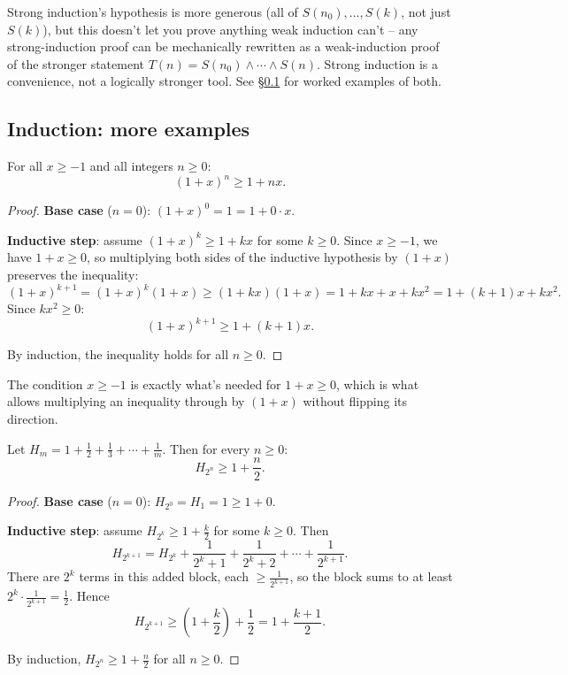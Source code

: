 \documentclass[11pt]{article}
\begin{document}
\begin{note}
Strong induction's hypothesis is more generous (all of $S(n_0),\dots,S(k)$, not just $S(k)$), but this doesn't let you prove anything weak induction can't -- any strong-induction proof can be mechanically rewritten as a weak-induction proof of the stronger statement $T(n) = S(n_0)\wedge\cdots\wedge S(n)$. Strong induction is a convenience, not a logically stronger tool. See \S\ref{sec:3-11} for worked examples of both.
\end{note}

\subsection{Induction: more examples}
\label{sec:3-11}

\bigskip
\begin{theorem}
For all $x \ge -1$ and all integers $n \ge 0$:
\[
(1+x)^n \ge 1 + nx.
\]
\end{theorem}
\begin{proof}
\textbf{Base case} ($n=0$): $(1+x)^0 = 1 = 1+0\cdot x$.

\textbf{Inductive step}: assume $(1+x)^k \ge 1+kx$ for some $k \ge 0$. Since $x \ge -1$, we have $1+x \ge 0$, so multiplying both sides of the inductive hypothesis by $(1+x)$ preserves the inequality:
\[
(1+x)^{k+1} = (1+x)^k(1+x) \ge (1+kx)(1+x) = 1 + kx + x + kx^2 = 1 + (k+1)x + kx^2.
\]
Since $kx^2 \ge 0$:
\[
(1+x)^{k+1} \ge 1 + (k+1)x.
\]

By induction, the inequality holds for all $n \ge 0$.
\end{proof}

\begin{note}
The condition $x\ge-1$ is exactly what's needed for $1+x\ge0$, which is what allows multiplying an inequality through by $(1+x)$ without flipping its direction.
\end{note}

\bigskip
\begin{theorem}
Let $H_m = 1+\tfrac12+\tfrac13+\cdots+\tfrac1m$. Then for every $n\ge0$:
\[
H_{2^n} \ge 1+\frac{n}{2}.
\]
\end{theorem}
\begin{proof}
\textbf{Base case} ($n=0$): $H_{2^0}=H_1=1 \ge 1+0$.

\textbf{Inductive step}: assume $H_{2^k}\ge1+\frac{k}{2}$ for some $k\ge0$. Then
\[
H_{2^{k+1}} = H_{2^k} + \frac{1}{2^k+1}+\frac{1}{2^k+2}+\cdots+\frac{1}{2^{k+1}}.
\]
There are $2^k$ terms in this added block, each $\ge \frac{1}{2^{k+1}}$, so the block sums to at least $2^k\cdot\frac{1}{2^{k+1}}=\frac12$. Hence
\[
H_{2^{k+1}} \ge \left(1+\frac{k}{2}\right)+\frac12 = 1+\frac{k+1}{2}.
\]

By induction, $H_{2^n}\ge1+\frac{n}{2}$ for all $n\ge0$.
\end{proof}
\end{document}
